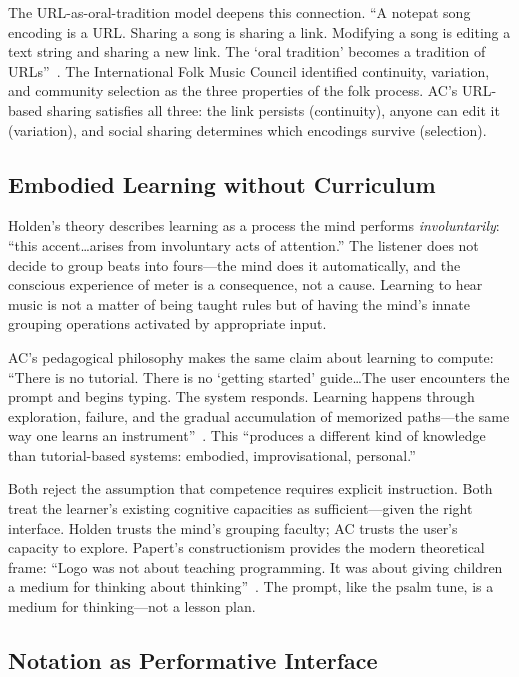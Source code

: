 \documentclass[10pt,letterpaper,twocolumn]{article}
\begin{document}
The URL-as-oral-tradition model deepens this connection. ``A notepat song encoding is a URL. Sharing a song is sharing a link. Modifying a song is editing a text string and sharing a new link. The `oral tradition' becomes a tradition of URLs''~\citep{acfolk2026}. The International Folk Music Council identified continuity, variation, and community selection as the three properties of the folk process. AC's URL-based sharing satisfies all three: the link persists (continuity), anyone can edit it (variation), and social sharing determines which encodings survive (selection).

\subsection{Embodied Learning without Curriculum}

Holden's theory describes learning as a process the mind performs \emph{involuntarily}: ``this accent\ldots arises from involuntary acts of attention.'' The listener does not decide to group beats into fours---the mind does it automatically, and the conscious experience of meter is a consequence, not a cause. Learning to hear music is not a matter of being taught rules but of having the mind's innate grouping operations activated by appropriate input.

AC's pedagogical philosophy makes the same claim about learning to compute: ``There is no tutorial. There is no `getting started' guide\ldots The user encounters the prompt and begins typing. The system responds. Learning happens through exploration, failure, and the gradual accumulation of memorized paths---the same way one learns an instrument''~\citep{acgoodiepal2026}. This ``produces a different kind of knowledge than tutorial-based systems: embodied, improvisational, personal.''

Both reject the assumption that competence requires explicit instruction. Both treat the learner's existing cognitive capacities as sufficient---given the right interface. Holden trusts the mind's grouping faculty; AC trusts the user's capacity to explore. Papert's constructionism provides the modern theoretical frame: ``Logo was not about teaching programming. It was about giving children a medium for thinking about thinking''~\citep{papert1980}. The prompt, like the psalm tune, is a medium for thinking---not a lesson plan.

\subsection{Notation as Performative Interface}
\end{document}
